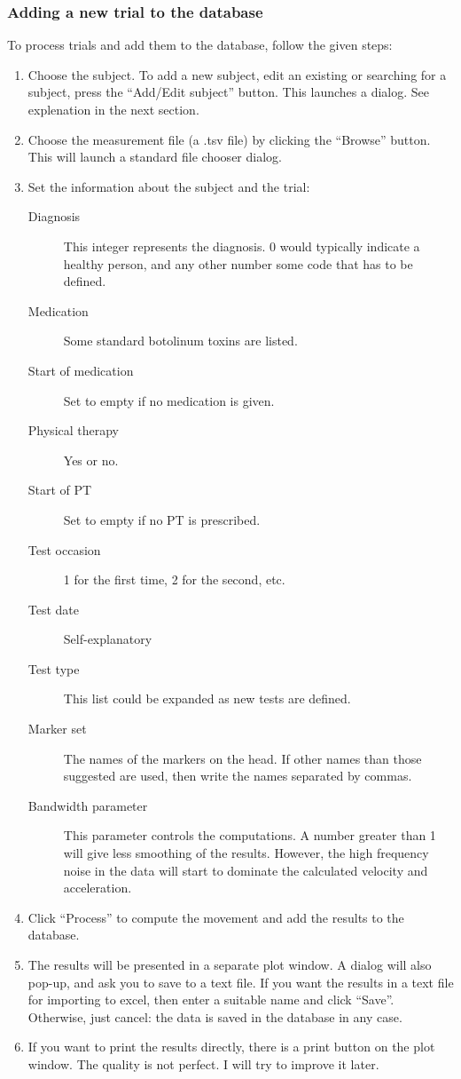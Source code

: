 \documentclass[a4paper,11pt]{article}
\begin{document}
\subsubsection{Adding a new trial to the database}
To process trials and add them to the database, follow the given
steps:
\begin{enumerate}
\item Choose the subject. To add a new subject, edit an existing or searching for a subject, press the ``Add/Edit
  subject'' button. This launches a dialog. See explenation in the next section.
\item Choose the measurement file (a .tsv file) by clicking the
  ``Browse'' button. This will launch a standard file chooser dialog.
\item Set the information about the subject and the trial:
  \begin{description}
  \item[Diagnosis] This integer represents the diagnosis. 0 would
    typically indicate a healthy person, and any other number some
    code that has to be defined.
  \item[Medication] Some standard botolinum toxins are listed.
  \item[Start of medication] Set to empty if no medication is given.
  \item[Physical therapy] Yes or no.
  \item[Start of PT]  Set to empty if no PT is prescribed.
  \item[Test occasion] 1 for the first time, 2 for the second, etc. 
  \item[Test date] Self-explanatory
  \item[Test type] This list could be expanded as new tests are
    defined.
  \item[Marker set] The names of the markers on the head. If other
    names than those suggested are used, then write the names
    separated by commas.
  \item[Bandwidth parameter] This parameter controls the
    computations. A number greater than 1 will give less smoothing of
    the results. However, the high frequency noise in the data will
    start to dominate the calculated velocity and acceleration.
  \end{description}
\item Click ``Process'' to compute the movement and add the results to
  the database.
\item The results will be presented in a separate plot window. A dialog
  will also pop-up, and ask you to save to a text file. If you want
  the results in a text file for importing to excel, then enter a
  suitable name and click ``Save''. Otherwise, just cancel: the data
  is saved in the database in any case.
\item If you want to print the results directly, there is a print
  button on the plot window. The quality is not perfect. I will try to
  improve it later.
\end{enumerate}
\end{document}
